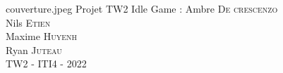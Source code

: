 \documentclass[11pt,a4paper]{article}
\author{RJ-MH}
\begin{document}
\PageDeGarde
{couverture.jpeg} %
{Projet TW2} %
{Idle Game :} %
{
Ambre \textsc{De crescenzo}\\
Nils \textsc{Etien}\\
Maxime \textsc{Huyenh}\\%
Ryan \textsc{Juteau}\\

}
{TW2 - ITI4 - 2022} %



\tableofcontents

\clearpage


\clearpage


\clearpage
%

\clearpage
%

\clearpage
%

\clearpage
%

\clearpage
%

\clearpage
%

\clearpage
%

\clearpage

\end{document}
